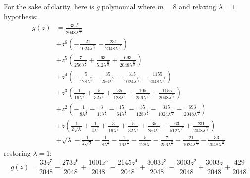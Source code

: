 For the sake of clarity, here is $g$ polynomial where $m=8$ and relaxing $\lambda=1$ hypothesis:
\begin{displaymath}
\begin{split}
g{\left (z \right )} &= \frac{33 z^{7}}{2048 \lambda^{\frac{13}{2}}} \\
&+ z^{6} \left(- \frac{21}{1024 \lambda^{\frac{11}{2}}} - \frac{231}{2048 \lambda^{\frac{13}{2}}}\right) \\
&+ z^{5} \left(\frac{7}{256 \lambda^{\frac{9}{2}}} + \frac{63}{512 \lambda^{\frac{11}{2}}} + \frac{693}{2048 \lambda^{\frac{13}{2}}}\right) \\
&+ z^{4} \left(- \frac{5}{128 \lambda^{\frac{7}{2}}} - \frac{35}{256 \lambda^{\frac{9}{2}}} - \frac{315}{1024 \lambda^{\frac{11}{2}}} - \frac{1155}{2048 \lambda^{\frac{13}{2}}}\right) \\
&+ z^{3} \left(\frac{1}{16 \lambda^{\frac{5}{2}}} + \frac{5}{32 \lambda^{\frac{7}{2}}} + \frac{35}{128 \lambda^{\frac{9}{2}}} + \frac{105}{256 \lambda^{\frac{11}{2}}} + \frac{1155}{2048 \lambda^{\frac{13}{2}}}\right) \\
&+ z^{2} \left(- \frac{1}{8 \lambda^{\frac{3}{2}}} - \frac{3}{16 \lambda^{\frac{5}{2}}} - \frac{15}{64 \lambda^{\frac{7}{2}}} - \frac{35}{128 \lambda^{\frac{9}{2}}} - \frac{315}{1024 \lambda^{\frac{11}{2}}} - \frac{693}{2048 \lambda^{\frac{13}{2}}}\right) \\
&+ z \left(\frac{1}{2 \sqrt{\lambda}} + \frac{1}{4 \lambda^{\frac{3}{2}}} + \frac{3}{16 \lambda^{\frac{5}{2}}} + \frac{5}{32 \lambda^{\frac{7}{2}}} + \frac{35}{256 \lambda^{\frac{9}{2}}} \right. + \left. \frac{63}{512 \lambda^{\frac{11}{2}}} + \frac{231}{2048 \lambda^{\frac{13}{2}}}\right) \\
&+ \sqrt{\lambda} - \frac{1}{2 \sqrt{\lambda}} - \frac{1}{8 \lambda^{\frac{3}{2}}} - \frac{1}{16 \lambda^{\frac{5}{2}}} - \frac{5}{128 \lambda^{\frac{7}{2}}} - \frac{7}{256 \lambda^{\frac{9}{2}}} - \frac{21}{1024 \lambda^{\frac{11}{2}}} - \frac{33}{2048 \lambda^{\frac{13}{2}}}
\end{split}
\end{displaymath}
restoring $\lambda=1$:
\begin{displaymath}
g{\left (z \right )} = \frac{33 z^{7}}{2048} - \frac{273 z^{6}}{2048} + \frac{1001 z^{5}}{2048} - \frac{2145 z^{4}}{2048} + \frac{3003 z^{3}}{2048} - \frac{3003 z^{2}}{2048} + \frac{3003 z}{2048} + \frac{429}{2048}
\end{displaymath}

